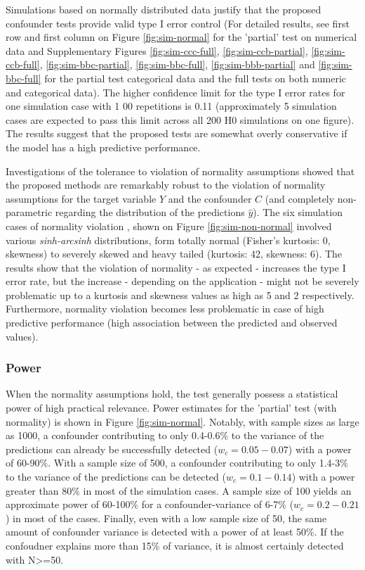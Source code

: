 \documentclass{article}
\begin{document}
Simulations based on normally distributed data justify that the proposed confounder tests provide valid type I error control (For detailed results, see first row and first column on Figure \ref{fig:sim-normal} for the 'partial' test on numerical data and Supplementary Figures \ref{fig:sim-ccc-full}, \ref{fig:sim-ccb-partial}, \ref{fig:sim-ccb-full}, \ref{fig:sim-bbc-partial}, \ref{fig:sim-bbc-full}, \ref{fig:sim-bbb-partial} and \ref{fig:sim-bbc-full} for the partial test categorical data and the full tests on both numeric and categorical data). The higher confidence limit for the type I error rates for one simulation case with 1
00 repetitions is 0.11 (approximately 5 simulation cases are expected to pass this limit across all 200 H0 simulations on one figure).
The results suggest that the proposed tests are somewhat overly conservative if the model has a high predictive performance.

Investigations of the tolerance to violation of normality assumptions showed that the proposed methods are remarkably robust to the violation of normality assumptions for the target variable $Y$ and the confounder $C$ (and completely non-parametric regarding the distribution of the predictions $\hat{y}$). The six simulation cases of normality violation , shown on Figure \ref{fig:sim-non-normal} involved various \emph{sinh-arcsinh} distributions, form totally normal (Fisher's kurtosis: 0, skewness) to severely skewed and heavy tailed (kurtosis: 42, skewness: 6).
The results show that the violation of normality - as expected - increases the type I error rate, but the increase - depending on the application - might not be severely problematic up to a kurtosis and skewness values as high as 5 and 2 respectively. Furthermore, normality violation becomes less problematic in case of high predictive performance (high association between the predicted and observed values).

\subsubsection*{Power}

When the normality assumptions hold, the test generally possess a statistical power of high practical relevance. Power estimates for the 'partial' test (with normality) is shown in Figure \ref{fig:sim-normal}. Notably, with sample sizes as large as 1000, a confounder contributing to only 0.4-0.6\% to the variance of the predictions can already be successfully detected ($w_c = 0.05 - 0.07$) with a power of 60-90\%. With a sample size of 500, a confounder contributing to only 1.4-3\% to the variance of the predictions can be detected ($w_c = 0.1 - 0.14$) with a power greater than 80\% in most of the simulation cases. A sample size of 100 yields an approximate power of 60-100\% for a confounder-variance of 6-7\% ($w_c = 0.2 - 0.21$) in most of the cases. Finally, even with a low sample size of 50, the same amount of confounder variance is detected with a power of at least 50\%. If the confoudner explains more than 15\% of variance, it is almost certainly detected with N>=50.
\end{document}
